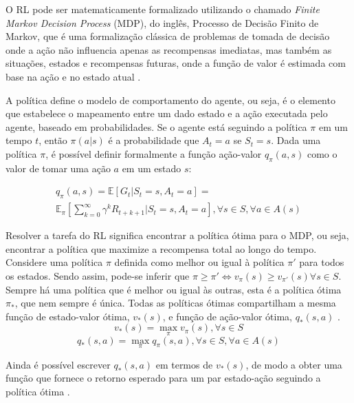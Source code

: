\documentclass[a4paper]{ifacconf}
\begin{document}
O RL pode ser matematicamente formalizado utilizando o chamado \emph{Finite Markov Decision Process} (MDP), do inglês, Processo de Decisão Finito de Markov, que é uma formalização clássica de problemas de tomada de decisão onde a ação não influencia apenas as recompensas imediatas, mas também as situações, estados e recompensas futuras, onde a função de valor é estimada com base na ação e no estado atual \citep{ql_model,markov_tut}. 

A política define o modelo de comportamento do agente, ou seja, é o elemento que estabelece o mapeamento entre um dado estado e a ação executada pelo agente, baseado em probabilidades\citep{rl_rob_survey}. Se o agente está seguindo a política $\pi$ em um tempo $t$, então $\pi(a|s)$ é a probabilidade que $A_{t} = a$ se $S_{t} = s$. Dada uma política $\pi$, é possível definir formalmente a função ação-valor $q_{\pi}(a,s)$ como o valor de tomar uma ação $a$ em um estado $s$:

\begin{multline}
q_{\pi}(a,s) = \mathbb{E}[G_{t}|S_{t}=s,A_{t}=a] = \\ 
\mathbb{E}_{\pi}[\sum_{k=0}^{\infty} \gamma^k R_{t+k+1}|S_{t}=s,A_{t}=a], \forall s \in S, \forall a \in A(s)
\label{eq:actionValueFunc}
\end{multline}

Resolver a tarefa do RL significa encontrar a política ótima para o MDP, ou seja, encontrar a política que maximize a recompensa total ao longo do tempo. Considere uma política $\pi$ definida como melhor ou igual à política $\pi'$ para todos os estados. Sendo assim, pode-se inferir que $\pi \geq \pi' \Leftrightarrow v_{\pi}(s) \geq v_{\pi'}(s) \forall s \in S$. Sempre há uma política que é melhor ou igual às outras, esta é a política ótima $\pi_{*}$, que nem sempre é única. Todas as políticas ótimas compartilham a mesma função de estado-valor ótima, $v_{*}(s)$, e função de ação-valor ótima, $q_{*}(s,a)$ \citep{intro_to_rl}.
\begin{equation}
v_{*}(s) = \max_{\pi} v_{\pi}(s), \forall s \in S
\label{eq:bestStateValue}
\end{equation}
\begin{equation}
q_{*}(s,a) = \max_{\pi} q_{\pi}(s,a), \forall s \in S,\forall a \in A(s)
\label{eq:bestActionValue}
\end{equation}

Ainda é possível escrever $q_{*}(s,a)$ em termos de $v_{*}(s)$, de modo a obter uma função que fornece o retorno esperado para um par estado-ação seguindo a política ótima \citep{intro_to_rl}.
\end{document}
